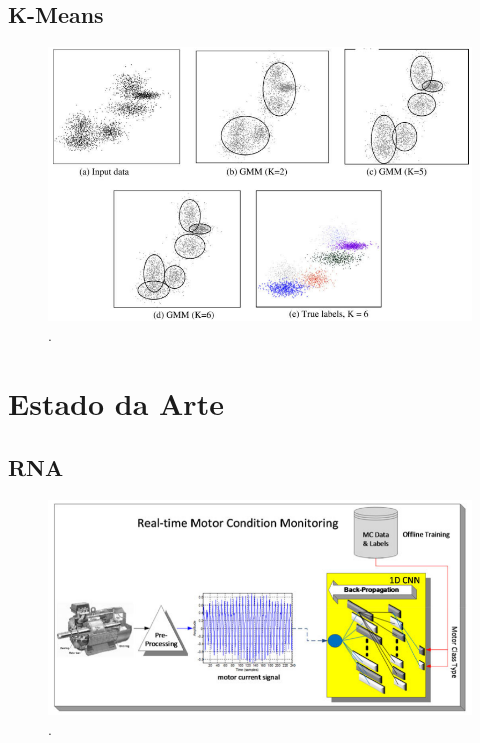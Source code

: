 \subsection{K-Means}

\begin{figure}[H]
    \caption{.}
    \begin{center}
        \includegraphics[scale=.5]{referencial/img/k-means_jain_p7.png}
    \end{center}
    \label{fig:}
\end{figure}


% 

\section{Estado da Arte}


% 

\subsection{RNA}

\begin{figure}[H]
    \caption{.}
    \begin{center}
        \includegraphics[scale=.45]{referencial/img/cnn_ince_p2.png}
    \end{center}
    \label{fig:}
\end{figure}

